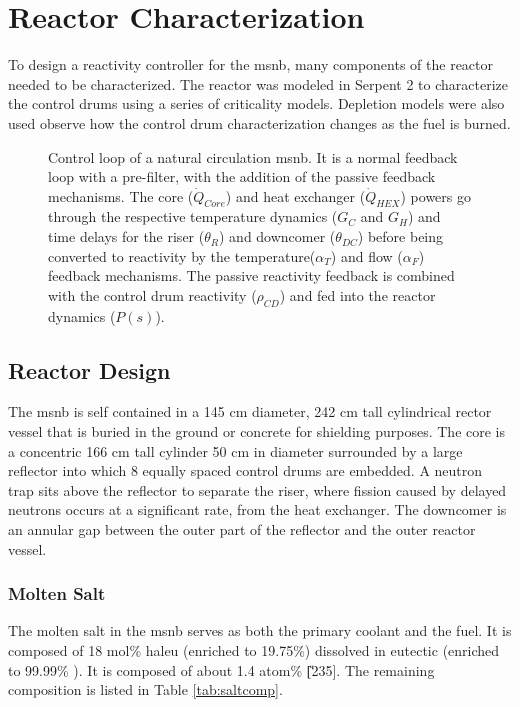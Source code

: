 \chapter{Reactor Characterization}
To design a reactivity controller for the \acl{msnb}, many components of the reactor needed to be characterized. The reactor was modeled in Serpent 2 to characterize the control drums using a series of criticality models. Depletion models were also used observe how the control drum characterization changes as the fuel is burned.


\label{Chapter:Modeling}
\begin{figure}[!ht]
    \centering
    \resizebox{\textwidth}{!}{}
    \caption[Control loop of a natural circulation \acs{msnb}]{Control loop of a natural circulation \acs{msnb}. It is a normal feedback loop with a pre-filter, with the addition of the passive feedback mechanisms. The core ($\dot{Q}_{Core}$) and heat exchanger ($\dot{Q}_{HEX}$) powers go through the respective temperature dynamics ($G_C$ and $G_H$) and time delays for the riser ($\theta_R$) and downcomer ($\theta_{DC}$) before being converted to reactivity by the temperature($\alpha_T$) and flow ($\alpha_F$) feedback mechanisms. The passive reactivity feedback is combined with the control drum reactivity ($\rho_{CD}$) and fed into the reactor dynamics ($P(s)$).  }
    \label{fig:ReactorControlLoop}
\end{figure}


\section{Reactor Design}
The \acs{msnb} is self contained in a 145 cm diameter, 242 cm tall cylindrical rector vessel that is buried in the ground or concrete for shielding purposes. The core is a concentric 166 cm tall cylinder 50 cm in diameter surrounded by a large reflector into which 8 equally spaced control drums are embedded. A neutron trap sits above the reflector to separate the riser, where fission caused by delayed neutrons occurs at a significant rate, from the heat exchanger. The downcomer is an annular gap between the outer part of the reflector and the outer reactor vessel. 

\subsection{Molten Salt}
The molten salt in the \acs{msnb} serves as both the primary coolant and the fuel. It is composed of 18 mol\% \acs{haleu} \UF \; (enriched to 19.75\%) dissolved in eutectic \flinak (enriched to 99.99\% \Li[7]). It is composed of about 1.4 atom\% \U[235]. The remaining composition is listed in Table \ref{tab:saltcomp}.

